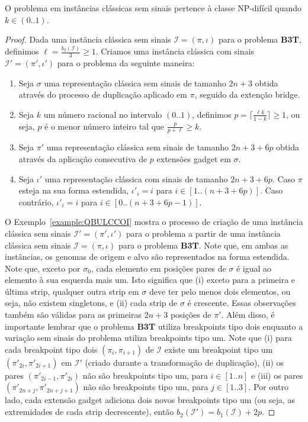 \begin{theorem}\label{theorem:QMHEKDLW}
O problema \SbPRT{} em instâncias clássicas sem sinais pertence à classe NP-difícil quando $k \in (0..1)$.
\end{theorem}
\begin{proof}
Dada uma instância clássica sem sinais $\mathcal{I}=(\pi,\iota)$ para o problema \textbf{B3T}, definimos $\ell = \frac{b_2(\mathcal{I})}{3} \ge 1$. Criamos uma instância clássica com sinais $\mathcal{I'}=(\pi',\iota')$ para o problema \SbPRT{} da seguinte maneira:

\begin{enumerate}
  \item Seja $\sigma$ uma representação clássica sem sinais de tamanho $2n+3$ obtida através do processo de duplicação aplicado em $\pi$, seguido da extenção bridge.
  \item Seja $k$ um número racional no intervalo $(0..1)$, definimos $p = \lceil\frac{\ell k}{1-k}\rceil \ge 1$, ou seja, $p$ é o menor número inteiro tal que $\frac{p}{p+\ell} \ge k$.
  \item Seja $\pi'$ uma representação clássica sem sinais de tamanho $2n+3+6p$ obtida através da aplicação consecutiva de $p$ extensões gadget em $\sigma$.
  \item Seja $\iota'$ uma representação clássica com sinais de tamanho $2n+3+6p$. Caso $\pi$ esteja na sua forma estendida, $\iota'_i = i$ para $i \in [1..(n+3+6p)]$. Caso contrário,  $\iota'_i = i$ para $i \in [0..(n+3+6p-1)]$.
\end{enumerate}

O Exemplo~\ref{example:QBULCCOI} mostra o processo de criação de uma instância clássica sem sinais $\mathcal{I'}=(\pi',\iota')$ para o problema \SbPRT{} a partir de uma instância clássica sem sinais $\mathcal{I}=(\pi,\iota)$ para o problema \textbf{B3T}. Note que, em ambas as instâncias, os genomas de origem e alvo são representados na forma estendida. Note que, exceto por $\sigma_0$, cada elemento em posições pares de $\sigma$ é igual ao elemento à sua esquerda mais um. Isto significa que (i) exceto para a primeira e última strip, qualquer outra strip em $\sigma$ deve ter pelo menos dois elementos, ou seja, não existem singletons, e (ii) cada strip de $\sigma$ é crescente. Essas observações também são válidas para as primeiras $2n+3$ posições de $\pi'$. Além disso, é importante lembrar que o problema \textbf{B3T} utiliza breakpoints tipo dois enquanto a variação sem sinais do problema \SbPRT{} utiliza breakpoints tipo um. Note que (i) para cada breakpoint tipo dois $(\pi_i,\pi_{i+1})$ de $\mathcal{I}$ existe um breakpoint tipo um $(\pi'_{2i},\pi'_{2i+1})$ em $\mathcal{I'}$ (criado durante a transformação de duplicação), (ii) os pares $(\pi'_{2i-1},\pi'_{2i})$ não são breakpoints tipo um, para $i \in [1..n]$ e (iii) os pares $(\pi'_{2n+j},\pi'_{2n+j+1})$ não são breakpoints tipo um, para $j \in [1..3]$. Por outro lado, cada extensão gadget adiciona dois novos breakpoints tipo um (ou seja, as extremidades de cada strip decrescente), então $b_2(\mathcal{I'}) = b_1(\mathcal{I}) +2p$.


\end{proof}
